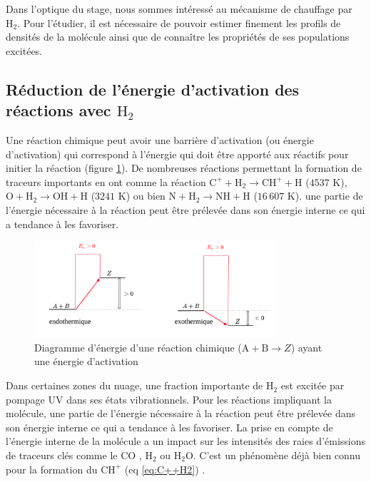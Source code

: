 Dans l'optique du stage, nous sommes intéressé au mécanisme de chauffage par $\mathrm{H}_2$. Pour l'étudier, il est nécessaire de pouvoir estimer finement les profils de densités de la molécule ainsi que de connaître les propriétés de ses populations excitées. 


\subsection{Réduction de l'énergie d'activation des réactions avec $\mathrm{H}_2$}

Une réaction chimique peut avoir une barrière d'activation (ou énergie d'activation) qui correspond à l'énergie qui doit être apporté aux réactifs pour initier la réaction (figure \ref{fig:H2:Ea}). De nombreuses réactions permettant la formation de traceurs importants en ont comme la réaction $\mathrm{C}^+ + \mathrm{H}_2 \rightarrow \mathrm{CH}^+ + \mathrm{H}$ ($4537$ K),  $\mathrm{O} + \mathrm{H}_2 \rightarrow \mathrm{OH} + \mathrm{H}$  ($3241$ K) ou bien $\mathrm{N} + \mathrm{H}_2 \rightarrow \mathrm{NH} + \mathrm{H}$ ($16\,607$ K). 
une partie de l'énergie nécessaire à la réaction peut être prélevée dans son énergie interne ce qui a tendance à les favoriser. 


\begin{figure}[!h]
    \centering
    \includegraphics[trim = {0 0 0 0cm },clip,width=0.8\textwidth]{figure/type46/Ea.pdf}
    \caption{Diagramme d'énergie d'une réaction chimique ($\mathrm{A}+\mathrm{B}\rightarrow Z$) ayant une énergie d'activation}
    \label{fig:H2:Ea}
\end{figure}

Dans certaines zones du nuage, une fraction importante de $\mathrm{H}_2$ est excitée par pompage UV dans ses états vibrationnels. Pour les réactions impliquant la molécule, une partie de l'énergie nécessaire à la réaction peut être prélevée dans son énergie interne ce qui a tendance à les favoriser. La prise en compte de l'énergie interne de la molécule a un impact sur les intensités des raies d'émissions de traceurs clés comme le $\mathrm{CO}$ \cite{COJoblin}, $\mathrm{H}_2$ ou $\mathrm{H}_2\mathrm{O}$. C'est un phénomène déjà bien connu pour la formation du $\mathrm{CH}^+$ (eq \ref{eq:C++H2}) \cite{Herraez, Zanchet}.

